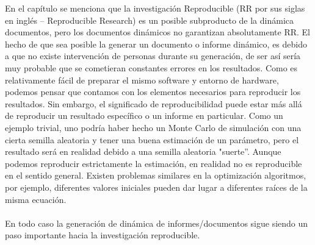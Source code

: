 \documentclass[conference]{IEEEtran}
\begin{document}
En el capítulo se menciona que la investigación Reproducible (RR por sus siglas en inglés – Reproducible Research) es un posible subproducto de la dinámica documentos, pero los documentos dinámicos no garantizan absolutamente RR. El hecho de que sea posible la generar un documento o informe dinámico, es debido a que no existe intervención de personas durante su generación, de ser así sería muy probable que se cometieran constantes errores en los resultados. Como es relativamente fácil de preparar el mismo software y entorno de hardware, podemos pensar que contamos con los elementos necesarios para reproducir los resultados. Sin embargo, el significado de reproducibilidad puede estar más allá de reproducir un resultado específico o un informe en particular. Como un ejemplo trivial, uno podría haber hecho un Monte Carlo de simulación con una cierta semilla aleatoria y tener una buena estimación de un parámetro, pero el resultado será en realidad debido a una semilla aleatoria "suerte”. Aunque podemos reproducir estrictamente la estimación, en realidad no es reproducible en el sentido general. Existen problemas similares en la optimización algoritmos, por ejemplo, diferentes valores iniciales pueden dar lugar a diferentes raíces de la misma ecuación.\\\\
En todo caso la generación de dinámica de informes/documentos sigue siendo un paso importante hacia la investigación reproducible. 


\end{document}
